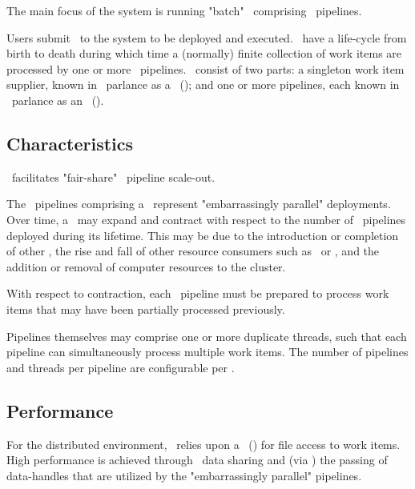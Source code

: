     The main focus of the system is running "batch" \varJobs~comprising \varUIMA~pipelines.
    
    Users submit \varJobs~to the system to be deployed and executed. \varJobs~have a
    life-cycle from birth to death during which time a (normally) finite collection of
    work items are processed by one or more \varUIMA~pipelines. \varJobs~consist of two
    parts: a singleton work item supplier, known in \varUIMA~parlance as a
    \varCollectionReader~(\varCR); and one or more pipelines, each known in \varUIMA~parlance
    as an \varAnalysisEngine~(\varAE).
        
    \subsection{Characteristics}   
    
    \varDUCC~facilitates "fair-share" \varUIMA~pipeline scale-out.
    
    The \varUIMA~pipelines comprising a \varJob~represent "embarrassingly parallel" 
    deployments. Over time, a \varJob~may expand and contract with respect to the number of 
    \varUIMA~pipelines deployed during its lifetime. This may be due to the introduction 
    or completion of other \varJobs, the rise and fall of other resource consumers such 
    as \varReservations~or \varServices, and the addition or removal of computer resources 
    to the cluster.
    
    With respect to contraction, each \varUIMA~pipeline must be prepared to
    process work items that may have been partially processed previously.
   
    Pipelines themselves may comprise one or more duplicate threads, such that each
    pipeline can simultaneously process multiple work items.
    The number of pipelines and threads per pipeline are configurable per \varJob.
   
    \subsection{Performance}  
    
    For the distributed environment, \varDUCC~relies upon a \varNetworkFileSystem~(\varNFS)
    for file access to work items.
    High performance is achieved through \varNFS~data sharing and (via \varActiveMQ) the passing of
    data-handles that are utilized by the "embarrassingly parallel" pipelines.
    
    \section{\varReservations}
    
